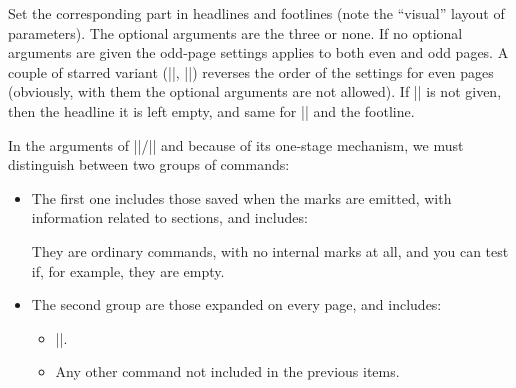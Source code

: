 \documentclass[a4paper]{ltxguide}
\begin{document}
Set the corresponding part in headlines and footlines (note the
``visual'' layout of parameters).  The optional arguments are the
three or none.  If no optional arguments are given the odd-page
settings applies to both even and odd pages.  A couple of starred
variant (|\setfoot*|, |\sethead*|) reverses the order of the settings
for even pages (obviously, with them the optional arguments are not
allowed).  If |\sethead| is not given, then the headline it is left
empty, and same for |\setfoot| and the footline.

In the arguments of |\sethead|/|\setfoot| and because of its one-stage
mechanism, we must distinguish between two groups of commands:
\begin{itemize}
\item The first one includes those saved when the marks are emitted,
with information related to sections, and includes:
They are ordinary commands, with no internal marks at all, and you can
test if, for example, they are empty.

\item The second group are those expanded on every page, and includes:
\begin{itemize}
\item |\thepage|.
\item Any other command not included in the previous items. 
\end{itemize}
\end{itemize}
\end{document}
